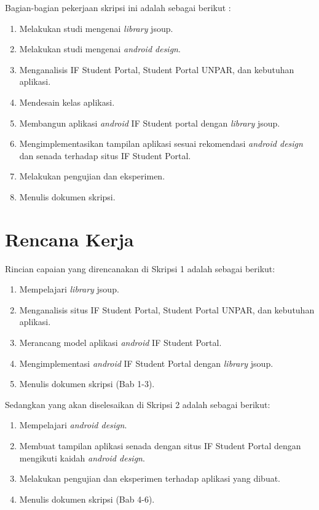 \documentclass[a4paper,twoside]{article}
\begin{document}
Bagian-bagian pekerjaan skripsi ini adalah sebagai berikut :
	\begin{enumerate}
		\item Melakukan studi mengenai \textit{library} jsoup.
		\item Melakukan studi mengenai \textit{android design}.
		\item Menganalisis IF Student Portal, Student Portal UNPAR, dan kebutuhan aplikasi.
		\item Mendesain kelas aplikasi.
		\item Membangun aplikasi \textit{android} IF Student portal dengan \textit{library} jsoup.
		\item Mengimplementasikan tampilan aplikasi sesuai rekomendasi \textit{android design} dan senada terhadap situs IF Student Portal.
		\item Melakukan pengujian dan eksperimen.
		\item Menulis dokumen skripsi.
	\end{enumerate}

\section{Rencana Kerja}
Rincian capaian yang direncanakan di Skripsi 1 adalah sebagai berikut:
\begin{enumerate}
\item Mempelajari \textit{library} jsoup.
\item Menganalisis situs IF Student Portal, Student Portal UNPAR, dan kebutuhan aplikasi.
\item Merancang model aplikasi \textit{android} IF Student Portal.
\item Mengimplementasi \textit{android} IF Student Portal dengan \textit{library} jsoup.
\item Menulis dokumen skripsi (Bab 1-3).
\end{enumerate}

Sedangkan yang akan diselesaikan di Skripsi 2 adalah sebagai berikut:
\begin{enumerate}
\item Mempelajari \textit{android design}.
\item Membuat tampilan aplikasi senada dengan situs IF Student Portal dengan mengikuti kaidah \textit{android design}.
\item Melakukan pengujian dan eksperimen terhadap aplikasi yang dibuat.
\item Menulis dokumen skripsi (Bab 4-6).
\end{enumerate}
\end{document}
